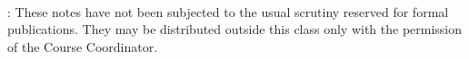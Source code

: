 \documentclass[11pt]{article}
\newcommand{\lecturenumber}{13}
\begin{document}
		\begin{center}
			\ \\
		\end{center}
		
		: {These notes have not been subjected to the
			usual scrutiny reserved for formal publications.  They may be distributed
			outside this class only with the permission of the Course Coordinator.}
		\vspace*{4mm}

        \tableofcontents
        \newpage
\end{document}
